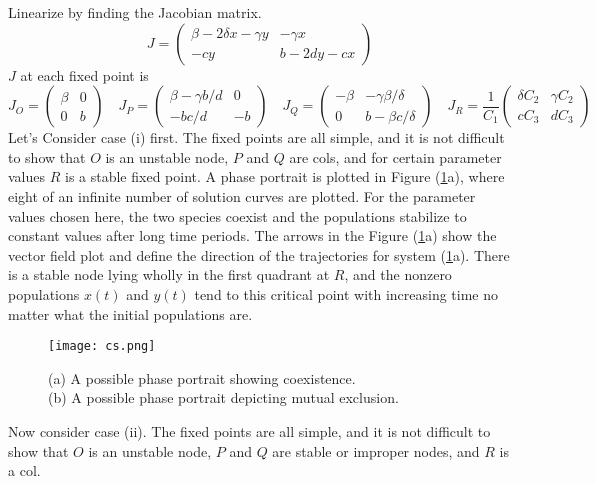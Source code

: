 Linearize by finding the Jacobian matrix.
\begin{equation}
	J=
	\begin{pmatrix}
		\beta-2\delta x-\gamma y&-\gamma x\\
		-cy&b-2dy-cx
	\end{pmatrix}
\end{equation}
$J$ at each fixed point is
\begin{equation*}
	J_O=
	\begin{pmatrix}
		\beta&0\\0&b
	\end{pmatrix}\quad
	J_P=
	\begin{pmatrix}
		\beta-\gamma b/d&0\\
		-bc/d&-b
	\end{pmatrix}\quad
	J_Q=
	\begin{pmatrix}
		-\beta&-\gamma \beta/\delta\\
		0&b-\beta c/\delta
	\end{pmatrix}\quad
	J_R=\frac{1}{C_1}
	\begin{pmatrix}
		\delta C_2&\gamma C_2\\
		cC_3&dC_3
	\end{pmatrix}
\end{equation*}
Let's Consider case (i) first.
The fixed points are all simple, and it is not difficult
to show that $O$ is an unstable node, $P$ and $Q$ are cols, and for certain parameter values $R$ is a stable fixed point.
A phase portrait is plotted in Figure (\ref{fig:cs}a), where eight of an infinite number of solution curves are plotted.
For the parameter values chosen here, the two species coexist and the populations stabilize to constant values after long time periods.
The arrows in the Figure (\ref{fig:cs}a) show the vector field plot and define the direction of the trajectories for system (\ref{fig:cs}a).
There is a stable node lying wholly in the first quadrant at $R$, and the nonzero populations $x(t)$ and $y(t)$ tend to this critical point with increasing time no matter what the initial populations are.\\
\begin{figure}[H]
	\centering
	\texttt{[image: cs.png]}
	\caption{(a) A possible phase portrait showing coexistence.\\(b) A possible phase portrait depicting mutual exclusion.}
	\label{fig:cs}
\end{figure}
Now consider case (ii).
The fixed points are all simple, and it is not difficult to show that $O$ is an unstable node, $P$ and $Q$ are stable or improper nodes, and $R$ is a col.
